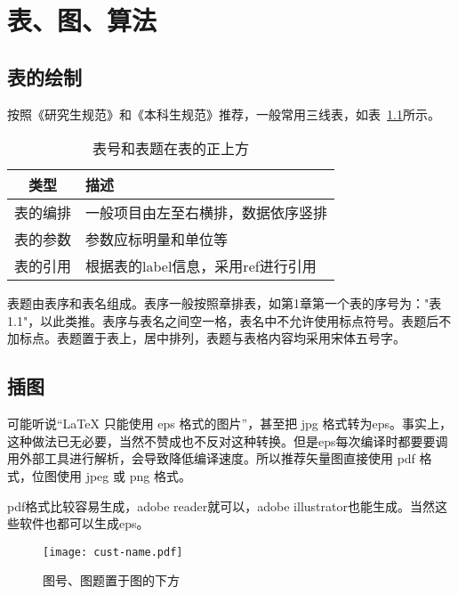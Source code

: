 
\chapter{表、图、算法}

\section{表的绘制}
按照《研究生规范》和《本科生规范》推荐，一般常用三线表，如表~\ref{tab:exampletable}所示。
\begin{table}[htbp]
  \centering
  \caption{表号和表题在表的正上方}
  \label{tab:exampletable}
  \begin{tabular}{cl}
    \toprule
    类型   & 描述                                       \\
    \midrule
    表的编排 & 一般项目由左至右横排，数据依序竖排 \\
    表的参数 & 参数应标明量和单位等   \\
    表的引用 & 根据表的label信息，采用ref进行引用       \\
    \bottomrule
  \end{tabular}
\end{table}

表题由表序和表名组成。表序一般按照章排表，如第1章第一个表的序号为："表1.1"，以此类推。表序与表名之间空一格，表名中不允许使用标点符号。表题后不加标点。表题置于表上，居中排列，表题与表格内容均采用宋体五号字。



\section{插图}

可能听说“\LaTeX{} 只能使用 eps 格式的图片”，甚至把 jpg 格式转为eps。事实上，这种做法已无必要，当然不赞成也不反对这种转换。但是eps每次编译时都要要调用外部工具进行解析，会导致降低编译速度。所以推荐矢量图直接使用 pdf 格式，位图使用 jpeg 或 png 格式。

pdf格式比较容易生成，adobe reader就可以，adobe illustrator也能生成。当然这些软件也都可以生成eps。
\begin{figure}[htbp]
  \centering
  \texttt{[image: cust-name.pdf]}
  \caption{图号、图题置于图的下方}
  \label{fig:badge}
\end{figure}

